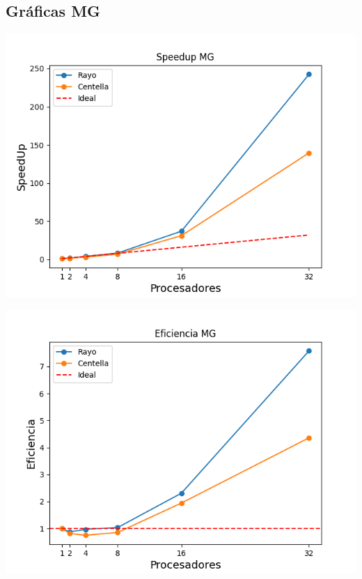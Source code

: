 \subsection{Gráficas MG}

\begin{center}
 \centering
 \begin{minipage}[b]{.49\textwidth}
  \includegraphics[width=1\linewidth]{plots/speed-up-mg.png}
 \end{minipage}
 \begin{minipage}[b]{.49\textwidth}
  \includegraphics[width=1\linewidth]{plots/efficiency-mg.png}
 \end{minipage}
\end{center}

